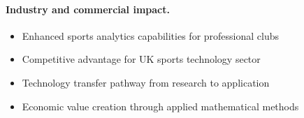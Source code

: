 \paragraph{Industry and commercial impact.}
\begin{itemize}
  \item Enhanced sports analytics capabilities for professional clubs
  \item Competitive advantage for UK sports technology sector
  \item Technology transfer pathway from research to application
  \item Economic value creation through applied mathematical methods
\end{itemize}
